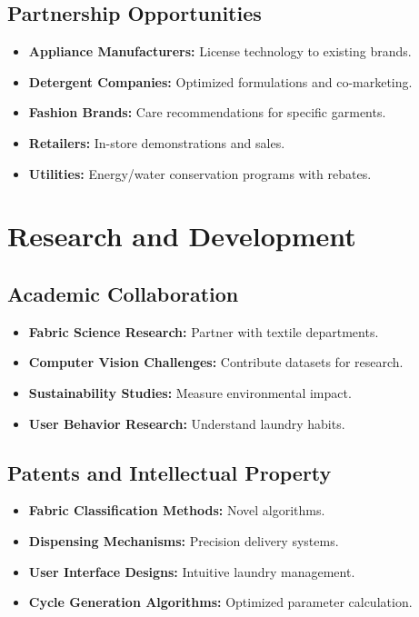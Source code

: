 \subsection{Partnership Opportunities}
\begin{itemize}
    \item \textbf{Appliance Manufacturers:} License technology to existing brands.
    \item \textbf{Detergent Companies:} Optimized formulations and co-marketing.
    \item \textbf{Fashion Brands:} Care recommendations for specific garments.
    \item \textbf{Retailers:} In-store demonstrations and sales.
    \item \textbf{Utilities:} Energy/water conservation programs with rebates.
\end{itemize}

\section{Research and Development}

\subsection{Academic Collaboration}
\begin{itemize}
    \item \textbf{Fabric Science Research:} Partner with textile departments.
    \item \textbf{Computer Vision Challenges:} Contribute datasets for research.
    \item \textbf{Sustainability Studies:} Measure environmental impact.
    \item \textbf{User Behavior Research:} Understand laundry habits.
\end{itemize}

\subsection{Patents and Intellectual Property}
\begin{itemize}
    \item \textbf{Fabric Classification Methods:} Novel algorithms.
    \item \textbf{Dispensing Mechanisms:} Precision delivery systems.
    \item \textbf{User Interface Designs:} Intuitive laundry management.
    \item \textbf{Cycle Generation Algorithms:} Optimized parameter calculation.
\end{itemize}

